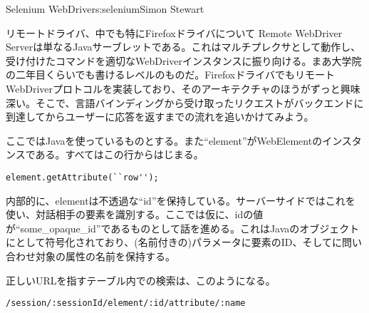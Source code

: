 \begin{aosachapter}{Selenium WebDriver}{s:selenium}{Simon Stewart}
\begin{aosasect1}{リモートドライバ、中でも特にFirefoxドライバについて}
Remote WebDriver Serverは単なるJavaサーブレットである。これはマルチプレクサとして動作し、受け付けたコマンドを適切なWebDriverインスタンスに振り向ける。まあ大学院の二年目くらいでも書けるレベルのものだ。FirefoxドライバでもリモートWebDriverプロトコルを実装しており、そのアーキテクチャのほうがずっと興味深い。そこで、言語バインディングから受け取ったリクエストがバックエンドに到達してからユーザーに応答を返すまでの流れを追いかけてみよう。


ここではJavaを使っているものとする。また``element''がWebElementのインスタンスである。すべてはこの行からはじまる。

\begin{verbatim}
element.getAttribute(``row'');
\end{verbatim}

\noindent 内部的に、elementは不透過な``id''を保持している。サーバーサイドではこれを使い、対話相手の要素を識別する。ここでは仮に、idの値が``some\_opaque\_id''であるものとして話を進める。これはJavaのオブジェクトにとして符号化されており、(名前付きの)パラメータに要素のID、そしてに問い合わせ対象の属性の名前を保持する。

正しいURLを指すテーブル内での検索は、このようになる。

\begin{verbatim}
/session/:sessionId/element/:id/attribute/:name
\end{verbatim}


\end{aosasect1}
\end{aosachapter}
